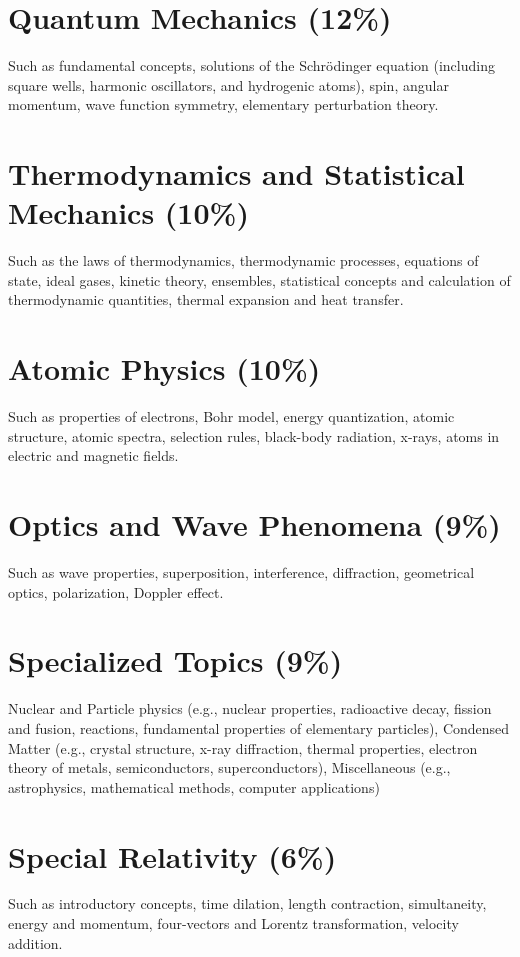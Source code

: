 \documentclass[%
 reprint,
superscriptaddress,
 amsmath,amssymb,
 aps,
prc,
]{revtex4-1}
\begin{document}
\section{Quantum Mechanics (12\%)}
Such as fundamental concepts, solutions of the Schrödinger equation (including square wells, harmonic oscillators, and hydrogenic atoms), spin, angular momentum, wave function symmetry, elementary perturbation theory.

\section{Thermodynamics and Statistical Mechanics (10\%)}
Such as the laws of thermodynamics, thermodynamic processes, equations of state, ideal gases, kinetic theory, ensembles, statistical concepts and calculation of thermodynamic quantities, thermal expansion and heat transfer.

\section{Atomic Physics (10\%)}
Such as properties of electrons, Bohr model, energy quantization, atomic structure, atomic spectra, selection rules, black-body radiation, x-rays, atoms in electric and magnetic fields.

\section{Optics and Wave Phenomena (9\%)}
Such as wave properties, superposition, interference, diffraction, geometrical optics, polarization, Doppler effect.

\section{Specialized Topics (9\%)}
Nuclear and Particle physics (e.g., nuclear properties, radioactive decay, fission and fusion, reactions, fundamental properties of elementary particles), Condensed Matter (e.g., crystal structure, x-ray diffraction, thermal properties, electron theory of metals, semiconductors, superconductors), Miscellaneous (e.g., astrophysics, mathematical methods, computer applications)

\section{Special Relativity (6\%)}
Such as introductory concepts, time dilation, length contraction, simultaneity, energy and momentum, four-vectors and Lorentz transformation, velocity addition.
\end{document}
